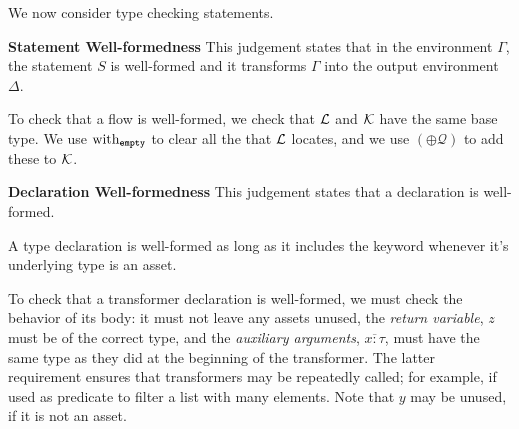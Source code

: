 \documentclass[nonacm, dvipsnames, sigconf]{acmart}
\begin{document}
We now consider type checking statements.

 \textbf{Statement Well-formedness}
This judgement states that in the environment $\Gamma$, the statement $S$ is well-formed and it transforms $\Gamma$ into the output environment $\Delta$.

To check that a flow is well-formed, we check that $\Loc$ and $\LocK$ have the same base type.
We use $\with_{\emptyq}$ to clear all the that $\Loc$ locates, and we use $(\oplus \mathcal{Q})$ to add these to $\LocK$.
\begin{mathpar}
\end{mathpar}

\framebox{$\flowproves \Decl~\ok$} \textbf{Declaration Well-formedness}
This judgement states that a declaration is well-formed.

A type declaration is well-formed as long as it includes the \asset keyword whenever it's underlying type is an asset.
\begin{mathpar}
\end{mathpar}

To check that a transformer declaration is well-formed, we must check the behavior of its body: it must not leave any assets unused, the \emph{return variable}, $z$ must be of the correct type, and the \emph{auxiliary arguments}, $\overline{x : \tau}$, must have the same type as they did at the beginning of the transformer.
The latter requirement ensures that transformers may be repeatedly called; for example, if used as predicate to filter a list with many elements.
Note that $y$ may be unused, if it is not an asset.
\begin{mathpar}
\end{mathpar}
\end{document}
